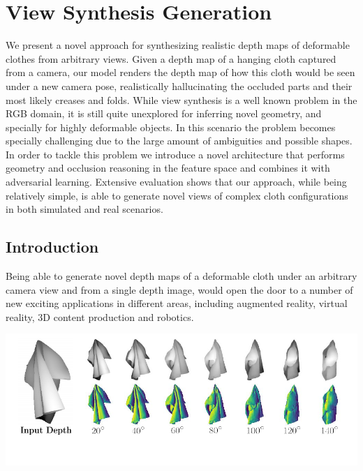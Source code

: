 \chapter{View Synthesis Generation}
\label{chap:chap_05}
\vspace{-8mm}

We present a novel approach for synthesizing realistic depth maps of deformable clothes from arbitrary views. Given a depth map of a hanging cloth captured from a camera, our model renders the depth map of how this cloth would be seen under a new camera pose, realistically hallucinating the occluded parts and their most likely creases and folds. While view synthesis is a well known problem in the RGB domain, it is still quite unexplored for inferring novel geometry, and specially for highly deformable objects. In this scenario the   problem becomes specially challenging due to the large amount of ambiguities and possible shapes. In order to tackle this  problem we introduce a novel architecture that performs geometry and occlusion reasoning in the feature space and combines it with adversarial learning.   Extensive evaluation shows that our approach, while being relatively simple, is able to generate novel views of complex cloth configurations in both simulated and real scenarios. 

\section{Introduction}

Being able to generate novel depth maps of a deformable cloth under an arbitrary camera view and from a single depth image,   would open the door to a number of new exciting applications in different areas, including augmented reality, virtual reality, 3D content production and robotics.

\begin{center}
    \centering
    \includegraphics[width=\linewidth]{main/chapter04/data/ipalm_cvpr_image_teaser.pdf}
    \label{fig:teaser}
\end{center}

